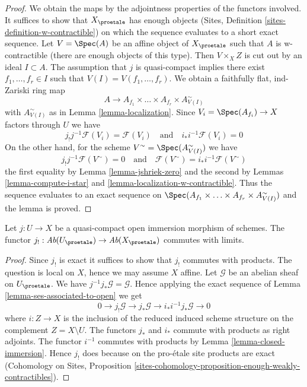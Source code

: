 \begin{proof}
We obtain the maps by the adjointness properties of the functors involved.
It suffices to show that $X_\proetale$ has enough objects
(Sites, Definition \ref{sites-definition-w-contractible}) on which
the sequence evaluates to a short exact sequence.
Let $V = \Spec(A)$ be an affine object of $X_\proetale$
such that $A$ is w-contractible (there are enough objects of this type).
Then $V \times_X Z$ is cut out by an ideal $I \subset A$.
The assumption that $j$ is quasi-compact implies there exist
$f_1, \ldots, f_r \in I$ such that $V(I) = V(f_1, \ldots, f_r)$.
We obtain a faithfully flat, ind-Zariski ring map
$$
A \longrightarrow A_{f_1} \times \ldots \times A_{f_r} \times
A_{V(I)}^\sim
$$
with $A_{V(I)}^\sim$ as in Lemma \ref{lemma-localization}.
Since $V_i = \Spec(A_{f_i}) \to X$ factors through $U$ we have
$$
j_!j^{-1}\mathcal{F}(V_i) = \mathcal{F}(V_i)
\quad\text{and}\quad
i_*i^{-1}\mathcal{F}(V_i) = 0
$$
On the other hand, for the scheme $V^\sim = \Spec(A_{V(I)}^\sim)$
we have
$$
j_!j^{-1}\mathcal{F}(V^\sim) = 0
\quad\text{and}\quad
\mathcal{F}(V^\sim) = i_*i^{-1}\mathcal{F}(V^\sim)
$$
the first equality by Lemma \ref{lemma-jshriek-zero}
and the second by
Lemmas \ref{lemma-compute-i-star} and \ref{lemma-localization-w-contractible}.
Thus the sequence evaluates to an exact sequence on
$\Spec(A_{f_1} \times \ldots \times A_{f_r} \times A_{V(I)}^\sim)$
and the lemma is proved.
\end{proof}

\begin{lemma}
\label{lemma-j-shriek-limits}
Let $j : U \to X$ be a quasi-compact open immersion
morphism of schemes. The functor
$j_! : \textit{Ab}(U_\proetale) \to \textit{Ab}(X_\proetale)$
commutes with limits.
\end{lemma}

\begin{proof}
Since $j_!$ is exact it suffices to show that $j_!$ commutes with products.
The question is local on $X$, hence we may assume $X$ affine.
Let $\mathcal{G}$ be an abelian sheaf on $U_\proetale$.
We have $j^{-1}j_*\mathcal{G} = \mathcal{G}$. Hence applying
the exact sequence of Lemma \ref{lemma-ses-associated-to-open}
we get
$$
0 \to j_!\mathcal{G} \to j_*\mathcal{G} \to i_*i^{-1}j_*\mathcal{G} \to 0
$$
where $i : Z \to X$ is the inclusion of the reduced induced scheme
structure on the complement $Z = X \setminus U$.
The functors $j_*$ and $i_*$ commute with products as right adjoints.
The functor $i^{-1}$ commutes with products by
Lemma \ref{lemma-closed-immersion}.
Hence $j_!$ does because on the pro-\'etale site products
are exact
(Cohomology on Sites, Proposition
\ref{sites-cohomology-proposition-enough-weakly-contractibles}).
\end{proof}




